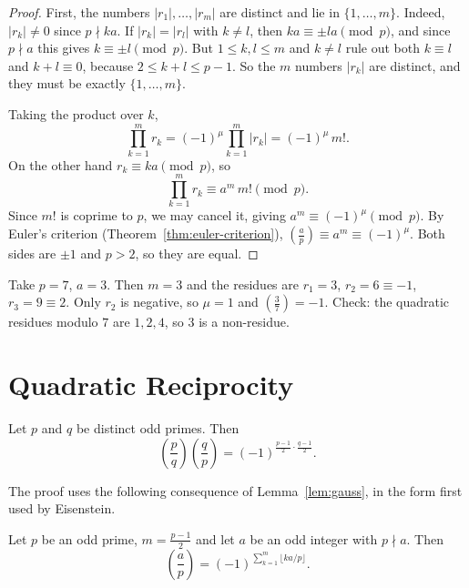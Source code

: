 \begin{proof}
First, the numbers $|r_1|,\dots,|r_m|$ are distinct and lie in $\{1,\dots,m\}$. Indeed, $|r_k|\ne 0$ since $p\nmid ka$. If $|r_k|=|r_l|$ with $k\ne l$, then $ka\equiv\pm la\pmod p$, and since $p\nmid a$ this gives $k\equiv\pm l\pmod p$. But $1\le k,l\le m$ and $k\ne l$ rule out both $k\equiv l$ and $k+l\equiv 0$, because $2\le k+l\le p-1$. So the $m$ numbers $|r_k|$ are distinct, and they must be exactly $\{1,\dots,m\}$.

Taking the product over $k$,
\[
  \prod_{k=1}^{m} r_k = (-1)^{\mu}\prod_{k=1}^m |r_k| = (-1)^{\mu}\, m!.
\]
On the other hand $r_k\equiv ka\pmod p$, so
\[
  \prod_{k=1}^{m} r_k\equiv a^{m}\, m!\pmod p.
\]
Since $m!$ is coprime to $p$, we may cancel it, giving $a^{m}\equiv(-1)^{\mu}\pmod p$. By Euler's criterion (Theorem~\ref{thm:euler-criterion}), $\left(\frac{a}{p}\right)\equiv a^{m}\equiv(-1)^{\mu}$. Both sides are $\pm 1$ and $p>2$, so they are equal.
\end{proof}

\begin{example}
Take $p=7$, $a=3$. Then $m=3$ and the residues are $r_1=3$, $r_2=6\equiv -1$, $r_3=9\equiv 2$. Only $r_2$ is negative, so $\mu=1$ and $\left(\frac{3}{7}\right)=-1$. Check: the quadratic residues modulo $7$ are $1,2,4$, so $3$ is a non-residue.
\end{example}

\section{Quadratic Reciprocity}

\begin{theorem}\label{thm:reciprocity}
Let $p$ and $q$ be distinct odd primes. Then
\[
  \left(\frac{p}{q}\right)\left(\frac{q}{p}\right)=(-1)^{\frac{p-1}{2}\cdot\frac{q-1}{2}}.
\]
\end{theorem}

The proof uses the following consequence of Lemma~\ref{lem:gauss}, in the form first used by Eisenstein.

\begin{lemma}\label{lem:eisenstein}
Let $p$ be an odd prime, $m=\frac{p-1}{2}$ and let $a$ be an odd integer with $p\nmid a$. Then
\[
  \left(\frac{a}{p}\right)=(-1)^{\sum_{k=1}^{m}\lfloor ka/p\rfloor}.
\]
\end{lemma}

